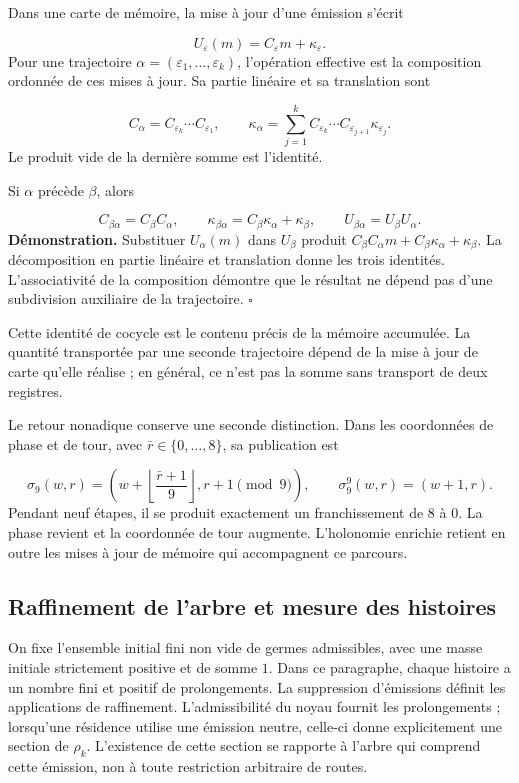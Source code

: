 Dans une carte de mémoire, la mise à jour d'une émission s'écrit

\[
U_\varepsilon(m)=C_\varepsilon m+\kappa_\varepsilon.
\]
Pour une trajectoire \(\alpha=(\varepsilon_1,\ldots,\varepsilon_k)\), l'opération effective est la composition ordonnée de ces mises à jour. Sa partie linéaire et sa translation sont

\[
C_\alpha=C_{\varepsilon_k}\cdots C_{\varepsilon_1},
\qquad
\kappa_\alpha=
\sum_{j=1}^{k}C_{\varepsilon_k}\cdots
C_{\varepsilon_{j+1}}\kappa_{\varepsilon_j}.
\]
Le produit vide de la dernière somme est l'identité.

Si \(\alpha\) précède \(\beta\), alors

\[
C_{\beta\alpha}=C_\beta C_\alpha,
\qquad
\kappa_{\beta\alpha}=C_\beta\kappa_\alpha+\kappa_\beta,
\qquad
U_{\beta\alpha}=U_\beta U_\alpha.
\]
\textbf{Démonstration.} Substituer \(U_\alpha(m)\) dans \(U_\beta\) produit \(C_\beta C_\alpha m+C_\beta\kappa_\alpha+\kappa_\beta\). La décomposition en partie linéaire et translation donne les trois identités. L'associativité de la composition démontre que le résultat ne dépend pas d'une subdivision auxiliaire de la trajectoire. \hfill\(\square\)

Cette identité de cocycle est le contenu précis de la mémoire accumulée. La quantité transportée par une seconde trajectoire dépend de la mise à jour de carte qu'elle réalise ; en général, ce n'est pas la somme sans transport de deux registres.

Le retour nonadique conserve une seconde distinction. Dans les coordonnées de phase et de tour, avec \(\bar r\in\{0,\ldots,8\}\), sa publication est

\[
\sigma_9(w,r)=
\left(w+\left\lfloor\frac{\bar r+1}{9}\right\rfloor,
r+1\pmod9\right),
\qquad
\sigma_9^9(w,r)=(w+1,r).
\]
Pendant neuf étapes, il se produit exactement un franchissement de \(8\) à \(0\). La phase revient et la coordonnée de tour augmente. L'holonomie enrichie retient en outre les mises à jour de mémoire qui accompagnent ce parcours.

\subsection{Raffinement de l'arbre et mesure des histoires}
On fixe l’ensemble initial fini non vide de germes admissibles, avec une masse initiale strictement positive et de somme \(1\). Dans ce paragraphe, chaque histoire a un nombre fini et positif de prolongements. La suppression d’émissions définit les applications de raffinement. L’admissibilité du noyau fournit les prolongements ; lorsqu’une résidence utilise une émission neutre, celle-ci donne explicitement une section de \(\rho_k\). L’existence de cette section se rapporte à l’arbre qui comprend cette émission, non à toute restriction arbitraire de routes.

